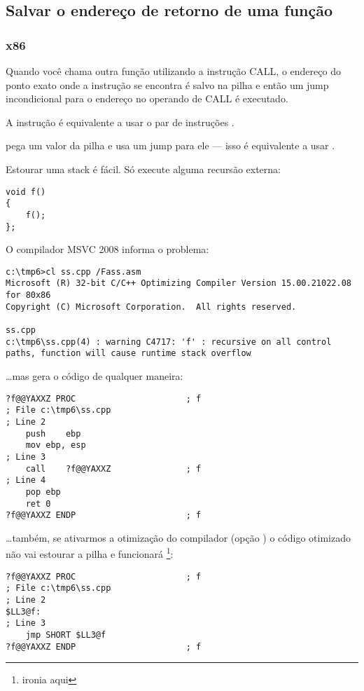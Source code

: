 \subsection{Salvar o endereço de retorno de uma função}

\subsubsection{x86}

Quando você chama outra função utilizando a instrução CALL, o endereço do ponto exato onde a 
instrução \CALL se encontra é salvo na pilha e então um jump incondicional para o endereço no operando de CALL é executado.

A instrução \CALL é equivalente a usar o par de instruções .

\RET pega um valor da pilha e usa um jump para ele --- isso é equivalente a usar .

\myindex{\Recursion}
Estourar uma stack é fácil. Só execute alguma recursão externa:

\begin{lstlisting}
void f()
{
	f();
};
\end{lstlisting}

O compilador MSVC 2008 informa o problema:

\begin{lstlisting}
c:\tmp6>cl ss.cpp /Fass.asm
Microsoft (R) 32-bit C/C++ Optimizing Compiler Version 15.00.21022.08 for 80x86
Copyright (C) Microsoft Corporation.  All rights reserved.

ss.cpp
c:\tmp6\ss.cpp(4) : warning C4717: 'f' : recursive on all control paths, function will cause runtime stack overflow
\end{lstlisting}

\dots mas gera o código de qualquer maneira:

\begin{lstlisting}
?f@@YAXXZ PROC						; f
; File c:\tmp6\ss.cpp
; Line 2
	push	ebp
	mov	ebp, esp
; Line 3
	call	?f@@YAXXZ				; f
; Line 4
	pop	ebp
	ret	0
?f@@YAXXZ ENDP						; f
\end{lstlisting}

\dots também, se ativarmos a otimização do compilador (opção ) 
o código otimizado não vai estourar a pilha e funcionará  \footnote{ironia aqui}:

\begin{lstlisting}
?f@@YAXXZ PROC						; f
; File c:\tmp6\ss.cpp
; Line 2
$LL3@f:
; Line 3
	jmp	SHORT $LL3@f
?f@@YAXXZ ENDP						; f
\end{lstlisting}

\PTBRph{}

